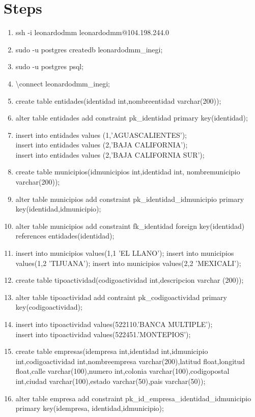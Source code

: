 \documentclass[10pt]{article}         %
\begin{document}
\section{Steps}
\begin{enumerate}
\item
	ssh -i leonardodmm leonardodmm@104.198.244.0
\item
	sudo -u postgres createdb leonardodmm\_inegi;
\item
	sudo -u postgres psql;
\item
	\textbackslash connect leonardodmm\_inegi;
\item
	create table entidades(identidad int,nombreentidad varchar(200));
\item
	alter table entidades add constraint pk\_identidad primary key(identidad);
\item
	insert into entidades values (1,'AGUASCALIENTES');\\
	insert into entidades values (2,'BAJA CALIFORNIA');\\
	insert into entidades values (2,'BAJA CALIFORNIA SUR');
\item
	create table municipios(idmunicipios int,identidad int, nombremunicipio varchar(200));
\item
	alter table municipios add constraint pk\_identidad\_idmunicipio primary key(identidad,idmunicipio);
\item
	alter table municipios add constraint fk\_identidad foreign key(identidad) references entidades(identidad);
\item
	insert into municipios values(1,1 'EL LLANO');
	insert into municipios values(1,2 'TIJUANA');
	insert into municipios values(2,2 'MEXICALI');
\item
	create table tipoactividad(codigoactividad int,descripcion varchar (200));
\item
	alter table tipoactividad add contraint pk\_codigoactividad primary key(codigoactividad);
\item	
	 insert into tipoactividad values(522110.'BANCA MULTIPLE');\\
	 insert into tipoactividad values(522451.'MONTEPIOS');
\item
	create table empresas(idempresa int,identidad int,idmunicipio int,codigoactividad int,nombreempresa varchar(200),latitud float,longitud float,calle varchar(100),numero int,colonia varchar(100),codigopostal int,ciudad varchar(100),estado varchar(50),pais varchar(50));
\item
	alter table empresa add constraint pk\_id\_empresa\_identidad\_idmunicipio primary key(idempresa, identidad,idmunicipio);

\end{enumerate}
\end{document}
